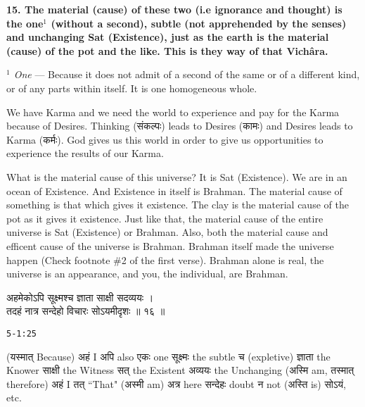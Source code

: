 \documentclass{article}
\begin{document}
\bigskip

\textbf{
    15. The material (cause) of these two (i.e ignorance and thought) is the one$^1$ (without a second), subtle (not apprehended by the senses) and unchanging Sat (Existence), just as the earth is the material (cause) of the pot and the like. This is they way of that Vichâra.
}

{\small \textit{$^1$ One} --- Because it does not admit of a second of the same
or of a different kind, or of any parts within itself. It is one homogeneous
whole.  }

\begin{oframed}
    We have Karma and we need the world to experience and pay for the Karma
    because of Desires. Thinking
    \texthindi{(संकल्पः)}
    leads to Desires
    \texthindi{(कामः)}
    and Desires leads to Karma
    \texthindi{(कर्मः)}.
    God gives us this world in order to give us opportunities to experience
    the results of our Karma.

    What is the material cause of this universe? It is Sat (Existence).  We are
    in an ocean of Existence. And Existence in itself is Brahman. The material
    cause of something is that which gives it existence. The clay is the
    material cause of the pot as it gives it existence. Just like that, the
    material cause of the entire universe is Sat (Existence) or Brahman. Also,
    both the material cause and efficent cause of the universe is Brahman.
    Brahman itself made the universe happen (Check footnote \#2 of the first
    verse). Brahman alone is real, the universe is an appearance, and you, the
    individual, are Brahman.

\end{oframed}


\begin{large}
\begin{center}
    \begin{hindi}
    अहमेकोऽपि सूक्ष्मश्च ज्ञाता साक्षी सदव्ययः ।\\
    तदहं नात्र सन्देहो विचारः सोऽयमीदृशः ॥ १६ ॥
    \end{hindi}
\end{center}
\end{large}
\texttt{5-1:25}

(\texthindi{यस्मात्}
Because)
\texthindi{अहं}
I
\texthindi{अपि}
also
\texthindi{एकः}
one
\texthindi{सूक्ष्मः}
the subtle
\texthindi{च}
(expletive)
\texthindi{ज्ञाता}
the Knower
\texthindi{साक्षी}
the Witness
\texthindi{सत्}
the Existent
\texthindi{अव्ययः}
the Unchanging
(\texthindi{अस्मि}
am,
\texthindi{तस्मात्}
therefore)
\texthindi{अहं}
I
\texthindi{तत्}
``That"
(\texthindi{अस्मी}
am)
\texthindi{अत्र}
here
\texthindi{सन्देहः}
doubt
\texthindi{न}
not
(\texthindi{अस्ति}
is)
\texthindi{सोऽयं,}
etc.
\end{document}
